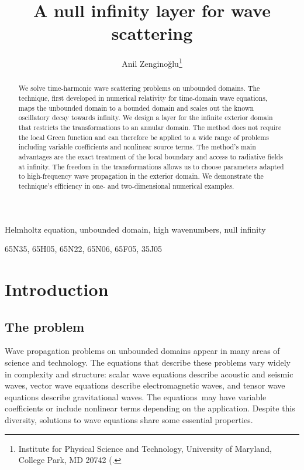 \documentclass[draft,onefignum,onetabnum]{siamart190516}
\title{A null infinity layer for wave scattering}
\author{Anil Zengino\u{g}lu\thanks{Institute for Physical Science and Technology, University of Maryland, College Park, MD 20742
  (\email{anil@umd.edu)}.}}
\date{}
\begin{document}
\maketitle

\begin{abstract}
We solve time-harmonic wave scattering problems on unbounded domains. The technique, first developed in numerical relativity for time-domain wave equations, maps the unbounded domain to a bounded domain and scales out the known oscillatory decay towards infinity. We design a layer for the infinite exterior domain that restricts the transformations to an annular domain. The method does not require the local Green function and can therefore be applied to a wide range of problems including variable coefficients and nonlinear source terms. The method's main advantages are the exact treatment of the local boundary and access to radiative fields at infinity. The freedom in the transformations allows us to choose parameters adapted to high-frequency wave propagation in the exterior domain. We demonstrate the technique's efficiency in one- and two-dimensional numerical examples.
\end{abstract}

\begin{keywords}
	Helmholtz equation, unbounded domain, high wavenumbers, null infinity %
\end{keywords}

\begin{AMS}
	65N35, %
	65H05, %
	65N22, %
	65N06, %
	65F05, %
	35J05  %
\end{AMS}


\section{Introduction}

\subsection{The problem}
Wave propagation problems on unbounded domains appear in many areas of science and technology. The equations that describe these problems vary widely in complexity and structure: scalar wave equations describe acoustic and seismic waves, vector wave equations describe electromagnetic waves, and tensor wave equations describe gravitational waves. The equations may have variable coefficients or include nonlinear terms depending on the application. Despite this diversity, solutions to wave equations share some essential properties.
\end{document}
